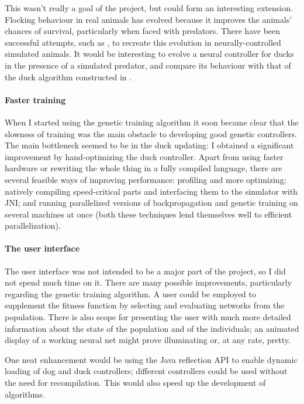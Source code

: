 \documentclass[a4paper]{report}
\begin{document}
This wasn't really a goal of the project, but could form an
interesting extension. Flocking behaviour in real animals has evolved
because it improves the animals' chances of survival, particularly
when faced with predators. There have been successful attempts, such
as \cite{werner-dyer92}, to recreate this evolution in
neurally-controlled simulated animals. It would be interesting to
evolve a neural controller for ducks in the presence of a simulated
predator, and compare its behaviour with that of the duck algorithm
constructed in \cite{vaughan98}.

\paragraph{Faster training} When I started using the genetic training
algorithm it soon became clear that the slowness of training was the
main obstacle to developing good genetic controllers. The main
bottleneck seemed to be in the duck updating: I obtained a significant
improvement by hand-optimizing the duck controller. Apart from using
faster hardware or rewriting the whole thing in a fully compiled
language, there are several feasible ways of improving performance:
profiling and more optimizing; natively compiling speed-critical parts
and interfacing them to the simulator with JNI; and running
parallelized versions of backpropagation and genetic training on
several machines at once (both these techniques lend themselves well
to efficient parallelization).

\paragraph{The user interface} The user interface was not intended to
be a major part of the project, so I did not spend much time on
it. There are many possible improvements, particularly regarding the
genetic training algorithm. A user could be employed to supplement the
fitness function by selecting and evaluating networks from the
population. There is also scope for presenting the user with much more
detailed information about the state of the population and of the
individuals; an animated display of a working neural net might prove
illuminating or, at any rate, pretty.

One neat enhancement would be using the Java reflection API to enable
dynamic loading of dog and duck controllers; different controllers
could be used without the need for recompilation. This would also
speed up the development of algorithms.
\end{document}
